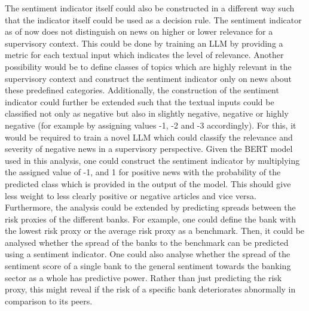 The sentiment indicator itself could also be constructed in a different way such that the indicator itself could be used as a decision rule. The sentiment indicator as of now does not distinguish on news on higher or lower relevance for a supervisory context. This could be done by training an LLM by providing a metric for each textual input which indicates the level of relevance. Another possibility would be to define classes of topics which are highly relevant in the supervisory context and construct the sentiment indicator only on news about these predefined categories. Additionally, the construction of the sentiment indicator could further be extended such that the textual inputs could be classified not only as negative but also in slightly negative, negative or highly negative (for example by assigning values -1, -2 and -3 accordingly). For this, it would be required to train a novel LLM which could classify the relevance and severity of negative news in a supervisory perspective. Given the BERT model used in this analysis, one could construct the sentiment indicator by multiplying the assigned value of -1, and 1 for positive news with the probability of the predicted class which is provided in the output of the model. This should give less weight to less clearly positive or negative articles and vice versa. \\

Furthermore, the analysis could be extended by predicting spreads between the risk proxies of the different banks. For example, one could define the bank with the lowest risk proxy or the average risk proxy as a benchmark. Then, it could be analysed whether the spread of the banks to the benchmark can be predicted using a sentiment indicator. One could also analyse whether the spread of the sentiment score of a single bank to the general sentiment towards the banking sector as a whole has predictive power. Rather than just predicting the risk proxy, this might reveal if the risk of a specific bank deteriorates abnormally in comparison to its peers.


\cleardoublepage
